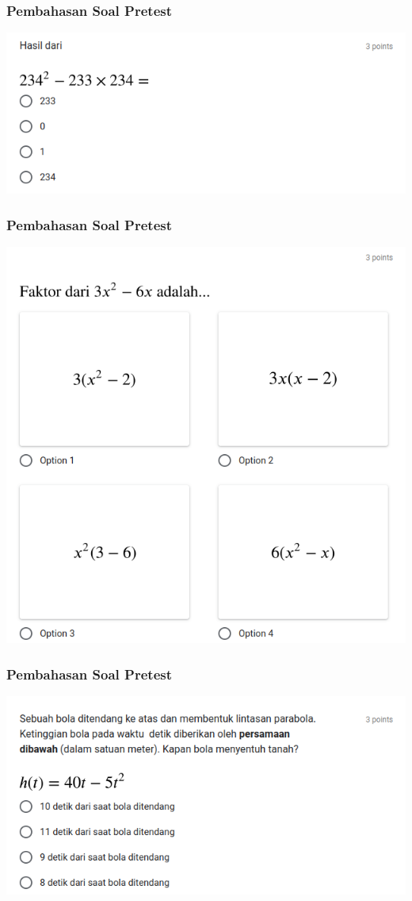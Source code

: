 \documentclass[pdflatex,compress,mathserif]{beamer}
\begin{document}
	\begin{frame}
		\frametitle{Pembahasan Soal Pretest}
		\begin{center}
			\includegraphics[width=\linewidth]{img/img25}
		\end{center}
	\end{frame}
	
	\begin{frame}
		\frametitle{Pembahasan Soal Pretest}
		\begin{center}
			\includegraphics[width=0.6\linewidth]{img/img26}
		\end{center}
	\end{frame}
	
	\begin{frame}
		\frametitle{Pembahasan Soal Pretest}
		\begin{center}
			\includegraphics[width=\linewidth]{img/img27}
		\end{center}
	\end{frame}
	
\end{document}
